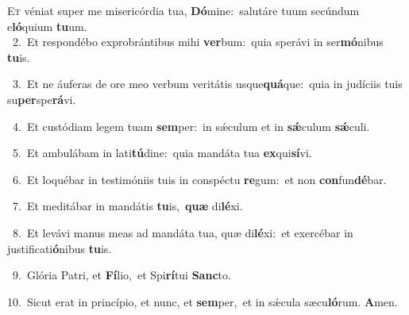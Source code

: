 \lettrine{\initial\textcolor{\initialcolor}{E}}{t} véniat super me misericórdia tua, \textbf{Dó}\-mine:~\star salutáre tuum secúndum e\-\textbf{ló}\-quium \textbf{tu}\-um.\\
{\numbfont\textcolor{\numbcolor}{~2.}}~Et respondébo exprobrántibus mihi \textbf{ver}\-bum:~\star quia sperávi in ser\-\textbf{mó}\-nibus \textbf{tu}\-is.\par
{\numbfont\textcolor{\numbcolor}{~3.}}~Et ne áuferas de ore meo verbum veritátis usque\-\textbf{quá}\-que:~\star quia in judíciis tuis su\-\textbf{per}\-spe\-\textbf{rá}\-vi.\par
{\numbfont\textcolor{\numbcolor}{~4.}}~Et custódiam legem tuam \textbf{sem}\-per:~\star in sǽculum et in \textbf{sǽ}\-culum \textbf{sǽ}\-culi.\par
{\numbfont\textcolor{\numbcolor}{~5.}}~Et ambulábam in lati\-\textbf{tú}\-dine:~\star quia mandáta tua \textbf{ex}\-qui\-\textbf{sí}\-vi.\par
{\numbfont\textcolor{\numbcolor}{~6.}}~Et loquébar in testimóniis tuis in conspéctu \textbf{re}\-gum:~\star et non \textbf{con}\-fun\-\textbf{dé}\-bar.\par
{\numbfont\textcolor{\numbcolor}{~7.}}~Et meditábar in mandátis \textbf{tu}\-is,~\star \textbf{quæ} di\-\textbf{lé}\-xi.\par
{\numbfont\textcolor{\numbcolor}{~8.}}~Et levávi manus meas ad mandáta tua, quæ di\-\textbf{lé}\-xi:~\star et exercébar in justificati\-\textbf{ó}\-nibus \textbf{tu}\-is.\par
{\numbfont\textcolor{\numbcolor}{~9.}}~Glória Patri, et \textbf{Fí}\-lio,~\star et Spi\-\textbf{rí}\-tui \textbf{Sanc}\-to.\par
{\numbfont\textcolor{\numbcolor}{10.}}~Sicut erat in princípio, et nunc, et \textbf{sem}\-per,~\star et in sǽcula sæcu\-\textbf{ló}\-rum. \textbf{A}\-men.\par
